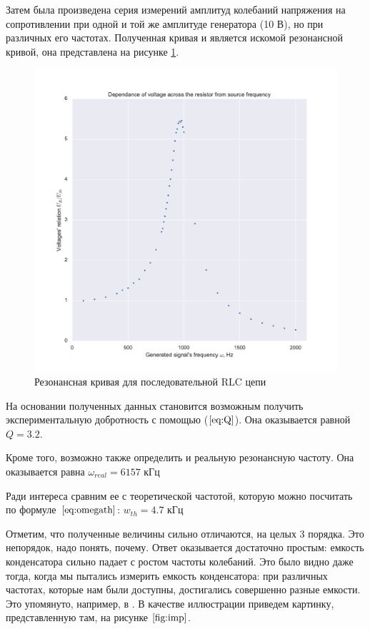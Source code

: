 \documentclass[a4paper, 12pt]{article}
\begin{document}
Затем была произведена серия измерений амплитуд колебаний напряжения на сопротивлении при одной и той же амплитуде генератора (10 В), но при различных его частотах. Полученная кривая и является искомой резонансной кривой, она представлена на рисунке \ref{fig:resonance_curve}.

\begin{figure}[h!]
	\centering
	\includegraphics[width=0.7\linewidth]{Series_connection}
	\caption{Резонансная кривая для последовательной RLC цепи}
	\label{fig:resonance_curve}
\end{figure}

На основании полученных данных становится возможным получить экспериментальную добротность с помощью ($\ref{eq:Q}$). Она оказывается равной $\boxed{Q = 3.2}$.


Кроме того, возможно также определить и реальную резонансную частоту. Она оказывается равна $\boxed{\omega_{real} = 6157 \text{ кГц}}$

Ради интереса сравним ее с теоретической частотой, которую можно посчитать по формуле~$\ref{eq:omegath}$: $\boxed{w_{th} = 4.7 \text{ кГц}}$

Отметим, что полученные величины сильно отличаются, на целых 3 порядка. Это непорядок, надо понять, почему. Ответ оказывается достаточно простым: емкость конденсатора сильно падает с ростом частоты колебаний. Это было видно даже тогда, когда мы пытались измерить емкость конденсатора: при различных частотах, которые нам были доступны, достигались совершенно разные емкости. Это упомянуто, например, в \cite{Picture_source}. В качестве иллюстрации приведем картинку, представленную там, на рисунке $\ref{fig:imp}$.
\end{document}
